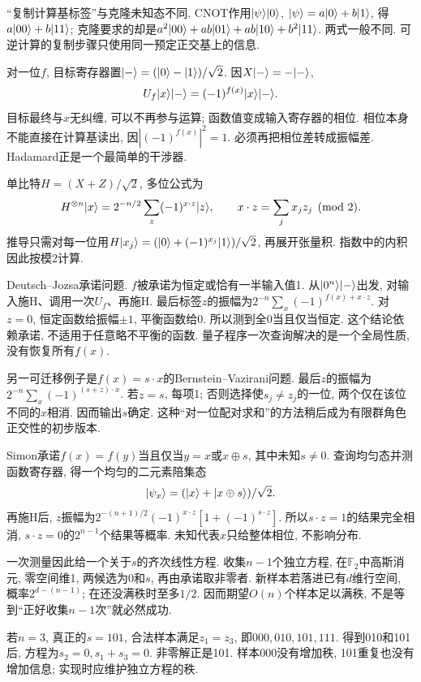 “复制计算基标签”与克隆未知态不同. CNOT作用$\lvert \psi\rangle\lvert 0\rangle$, $\lvert \psi\rangle=a\lvert 0\rangle+b\lvert 1\rangle$, 得$a\lvert 00\rangle+b\lvert 11\rangle$; 克隆要求的却是$a^2\lvert 00\rangle+ab\lvert 01\rangle+ab\lvert 10\rangle+b^2\lvert 11\rangle$. 两式一般不同. 可逆计算的复制步骤只使用同一预定正交基上的信息.

对一位$f$, 目标寄存器置$\lvert -\rangle=(\lvert 0\rangle-\lvert 1\rangle)/\sqrt2$. 因$X\lvert -\rangle=-\lvert -\rangle$,
\[U_f\lvert x\rangle\lvert -\rangle=(-1)^{f(x)}\lvert x\rangle\lvert -\rangle.\]
目标最终与$x$无纠缠, 可以不再参与运算; 函数值变成输入寄存器的相位. 相位本身不能直接在计算基读出, 因$|(-1)^{f(x)}|^2=1$. 必须再把相位差转成振幅差. Hadamard正是一个最简单的干涉器.

单比特$H=(X+Z)/\sqrt2$, 多位公式为
\[H^{\otimes n}\lvert x\rangle=2^{-n/2}\sum_z(-1)^{x\cdot z}\lvert z\rangle,\qquad
x\cdot z=\sum_jx_jz_j\pmod2.\]
推导只需对每一位用$H\lvert x_j\rangle=(\lvert 0\rangle+(-1)^{x_j}\lvert 1\rangle)/\sqrt2$, 再展开张量积. 指数中的内积因此按模2计算.

\begin{example}Deutsch--Jozsa承诺问题. $f$被承诺为恒定或恰有一半输入值1. 从$\lvert 0^n\rangle\lvert -\rangle$出发, 对输入施H、调用一次$U_f$、再施H. 最后标签$z$的振幅为$2^{-n}\sum_x(-1)^{f(x)+x\cdot z}$. 对$z=0$, 恒定函数给振幅$\pm1$, 平衡函数给0. 所以测到全0当且仅当恒定. 这个结论依赖承诺, 不适用于任意略不平衡的函数. 量子程序一次查询解决的是一个全局性质, 没有恢复所有$f(x)$.\end{example}

另一可迁移例子是$f(x)=s\cdot x$的Bernstein--Vazirani问题. 最后$z$的振幅为$2^{-n}\sum_x(-1)^{(s+z)\cdot x}$. 若$z=s$, 每项1; 否则选择使$s_j\ne z_j$的一位, 两个仅在该位不同的$x$相消. 因而输出$s$确定. 这种“对一位配对求和”的方法稍后成为有限群角色正交性的初步版本.

Simon承诺$f(x)=f(y)$当且仅当$y=x$或$x\oplus s$, 其中未知$s\ne0$. 查询均匀态并测函数寄存器, 得一个均匀的二元素陪集态
\[\lvert \psi_x\rangle=(\lvert x\rangle+\lvert x\oplus s\rangle)/\sqrt2.\]
再施H后, $z$振幅为$2^{-(n+1)/2}(-1)^{x\cdot z}[1+(-1)^{s\cdot z}]$. 所以$s\cdot z=1$的结果完全相消, $s\cdot z=0$的$2^{n-1}$个结果等概率. 未知代表$x$只给整体相位, 不影响分布.

一次测量因此给一个关于$s$的齐次线性方程. 收集$n-1$个独立方程, 在$\mathbb F_2$中高斯消元, 零空间维1, 两候选为$0$和$s$, 再由承诺取非零者. 新样本若落进已有$d$维行空间, 概率$2^{d-(n-1)}$; 在还没满秩时至多$1/2$. 因而期望$O(n)$个样本足以满秩, 不是等到“正好收集$n-1$次”就必然成功.

\begin{example}若$n=3$, 真正的$s=101$, 合法样本满足$z_1=z_3$, 即$000,010,101,111$. 得到010和101后, 方程为$s_2=0,s_1+s_3=0$. 非零解正是101. 样本000没有增加秩, 101重复也没有增加信息; 实现时应维护独立方程的秩.\end{example}

